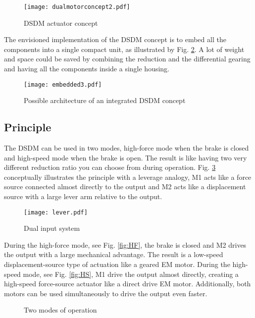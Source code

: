 \begin{figure}[H]
	\centering
		\texttt{[image: dualmotorconcept2.pdf]}
	\caption{DSDM actuator concept}
	\label{fig:dualmotorconcept}
\end{figure}

The envisioned implementation of the DSDM concept is to embed all the components into a single compact unit, as illustrated by Fig. \ref{fig:embedded}. A lot of weight and space could be saved by combining the reduction and the differential gearing and having all the components inside a single housing. 


\begin{figure}[H]
	\centering
		\texttt{[image: embedded3.pdf]}
	\caption{Possible architecture of an integrated DSDM concept}
	\label{fig:embedded}
\end{figure}



\subsection{Principle}

The DSDM can be used in two modes, high-force mode when the brake is closed and high-speed mode when the brake is open. The result is like having two very different reduction ratio you can choose from during operation. Fig. \ref{fig:lever} conceptually illustrates the principle with a leverage analogy, M1 acts like a force source connected almost directly to the output and M2 acts like a displacement source with a large lever arm relative to the output. 
%
\begin{figure}[H]
	\centering
		\texttt{[image: lever.pdf]}
	\caption{Dual input system}
	\label{fig:lever}
\end{figure}
%
During the high-force mode, see Fig. \ref{fig:HF}, the brake is closed and M2 drives the output with a large mechanical advantage. The result is a low-speed displacement-source type of actuation like a geared EM motor. During the high-speed mode, see Fig. \ref{fig:HS}, M1 drive the output almost directly, creating a high-speed force-source actuator like a direct drive EM motor. Additionally, both motors can be used simultaneously to drive the output even faster.
%
\begin{figure}[H]
        \centering
        \caption{Two modes of operation}\label{fig:opmode}
\end{figure}

